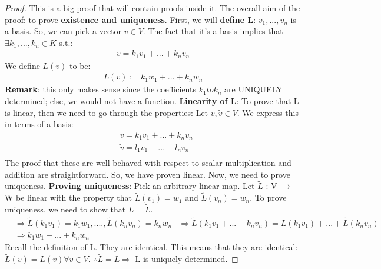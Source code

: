 \documentclass[a4paper, 12pt]{article}
\theoremstyle{definition}
\theoremstyle{definition}
\theoremstyle{definition}
\theoremstyle{definition}
\begin{document}
{\begin{proof}
	This is a big proof that will contain proofs inside it. The overall aim of the proof: to prove \textbf{existence and uniqueness}. 
	\newline
	\newline
	First, we will \textbf{define L}: $v_1, ..., v_n$ is a basis. So, we can pick a vector $v \in V$. The fact that it's a basis implies that $\exists k_1,...,k_n \in K$ s.t.: 
	\begin{align*}
		v = k_1v_1 + ... + k_n v_n 
	\end{align*}
	We define $L(v)$ to be: 
	\begin{align*}
		L(v) := k_1w_1 + ... + k_n w_n 
	\end{align*} 
	\textbf{Remark}: this only makes sense since the coefficients $k_1 to k_n$ are UNIQUELY determined; else, we would not have a function.
	\newline
	\newline
	\textbf{Linearity of L}: To prove that L is linear, then we need to go through the properties: Let $v, \tilde{v} \in V$. We express this in terms of a basis: 
	\begin{align*}
		& v = k_1 v_1 + ... + k_n v_n \\
		& \tilde{v} = l_1v_1 + ... + l_nv_n \\
	\end{align*} 
	The proof that these are well-behaved with respect to scalar multiplication and addition are straightforward. So, we have proven linear. Now, we need to prove uniqueness. 
	\newline
	\newline 
	\textbf{Proving uniqueness}: 
	\newline 
	Pick an arbitrary linear map. 
	\newline 
		Let $\tilde{L}$ : V $\rightarrow$ W be linear with the property that $\tilde{L}(v_1)  = w_1$ and $\tilde{L}(v_n) = w_n$. 
	\newline
	To prove uniqueness, we need to show that $L = \tilde{L}$. 
	\begin{align*}
		& \Rightarrow \tilde{L}(k_1v_1) = k_1w_1,...., \tilde{L}(k_nv_n) = k_nw_n  
		& \Rightarrow \tilde{L}(k_1v_1 + ... + k_nv_n) = \tilde{L}(k_1v_1) + ... + \tilde{L}(k_nv_n) \\ 
		& \Rightarrow k_1w_1 + ... + k_nw_n
	\end{align*}
	Recall the definition of L. They are identical. This means that they are identical: $\tilde{L}(v) = L(v) \forall v \in V$. 
	\newline
	\newline
	$\therefore \tilde{L} = L \Rightarrow$ L is uniquely determined. 
	

\end{proof}}
\end{document}
